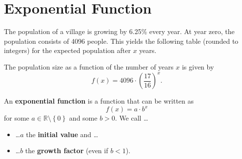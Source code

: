 \section{Exponential Function}
The population of a village is growing by 6.25\% every year.
At year zero, the population consists of 4096 people.
This yields the following table (rounded to integers) for the expected population after $x$ years.
\begin{figure}[ht]
	\centering
\end{figure}
The population size as a function of the number of years $x$ is given by
\begin{equation*}
	f\left(x\right)=4096\cdot\left(\frac{17}{16}\right)^x.
\end{equation*}
\begin{tcolorbox}
	An \textbf{exponential function} is a function that can be written as
	\begin{equation*}
		f\left(x\right)=a\cdot b^x
	\end{equation*}
	for some $a\in\mathbb R\setminus\left\{0\right\}$ and some $b>0$.
	We call \ldots
	\begin{itemize}
		\item[] \ldots$a$ the \textbf{initial value} and \ldots
		\item[] \ldots$b$ the \textbf{growth factor} (even if $b<1$).
	\end{itemize}
\end{tcolorbox}
